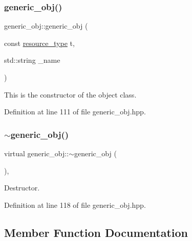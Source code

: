 \subsubsection{\texorpdfstring{generic\+\_\+obj()}{generic\_obj()}}
{\footnotesize\ttfamily generic\+\_\+obj\+::generic\+\_\+obj (\begin{DoxyParamCaption}\item[{const \hyperlink{classgeneric__obj_a340b4a97256b423ea4a86bfdf201ec65}{resource\+\_\+type}}]{t,  }\item[{std\+::string}]{\+\_\+name }\end{DoxyParamCaption})\hspace{0.3cm}{\ttfamily [inline]}}



This is the constructor of the object class. 



Definition at line 111 of file generic\+\_\+obj.\+hpp.

\mbox{\label{classgeneric__obj_ae3fa9b164093bb07a0438a5980972c13}} 
\subsubsection{\texorpdfstring{$\sim$generic\+\_\+obj()}{~generic\_obj()}}
{\footnotesize\ttfamily virtual generic\+\_\+obj\+::$\sim$generic\+\_\+obj (\begin{DoxyParamCaption}{ }\end{DoxyParamCaption})\hspace{0.3cm}{\ttfamily [inline]}, {\ttfamily [virtual]}}



Destructor. 



Definition at line 118 of file generic\+\_\+obj.\+hpp.



\subsection{Member Function Documentation}
\mbox{\label{classgeneric__obj_afd9c00bb476ce032d39f6df069184304}} 
